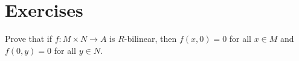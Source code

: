 %
%
%
%
%


\newpage
\section*{Exercises}


\begin{exercise}\label{exc:bilinear-zero}
Prove that if $f\colon M\times N \to A$ is $R$-bilinear, then $f(x,0)=0$ for all $x\in M$ and $f(0,y)=0$ for all $y\in N$.
\end{exercise}


